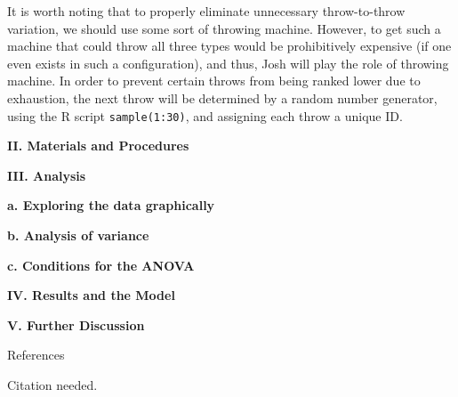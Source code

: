 \documentclass[letter,12pt]{article}
\begin{document}
	It is worth noting that to properly eliminate unnecessary throw-to-throw variation, we should use some sort of throwing machine. However, to get such a machine that could throw all three types would be prohibitively expensive (if one even exists in such a configuration), and thus, Josh will play the role of throwing machine. In order to prevent certain throws from being ranked lower due to exhaustion, the next throw will be determined by a random number generator, using the R script \verb|sample(1:30)|, and assigning each throw a unique ID.

	\begin{center}
		\textbf{II. Materials and Procedures}
	\end{center}
	\justify
	\lipsum[14-17]
	
	\begin{center}
		\textbf{III. Analysis}
	\end{center}
	\justify
	\lipsum[18]
	
	\begin{center}
		\textbf{a. Exploring the data graphically}
	\end{center}
	\justify
	\lipsum[19-22]
	
	\begin{center}
		\textbf{b. Analysis of variance}
	\end{center}
	\justify
	\lipsum[23-26]
	
	\begin{center}
		\textbf{c. Conditions for the ANOVA}
	\end{center}
	\justify
	\lipsum[27-29]
	
	\begin{center}
		\textbf{IV. Results and the Model}
	\end{center}
	\justify
	\lipsum[30-33]
	
	\begin{center}
		\textbf{V. Further Discussion}
	\end{center}
	\justify
	\lipsum[34-36]
	
	\newpage
	
	\begin{center}
		References
	\end{center}
	\raggedright
	\begin{hangparas}{.5in}{1}
		Citation needed.
	\end{hangparas}
\end{document}
